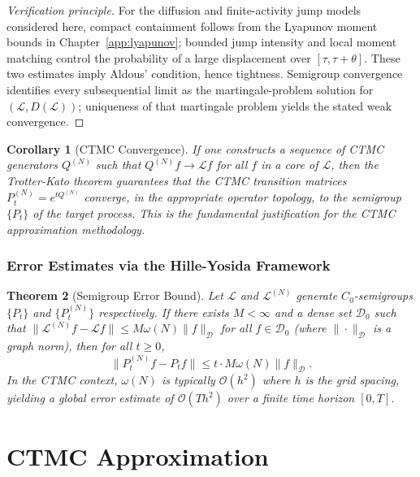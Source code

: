\documentclass[11pt,a4paper,openany]{book}
\theoremstyle{definition}
\theoremstyle{plain}
\newtheorem{theorem}{Theorem}[chapter]
\newtheorem{corollary}[theorem]{Corollary}
\theoremstyle{remark}
\newcommand{\1}{\mathbbm{1}}
\newcommand{\calL}{\mathcal{L}}
\newcommand{\calD}{\mathcal{D}}
\begin{document}
\begin{proof}[Verification principle]
For the diffusion and finite-activity jump models considered here, compact containment follows from the Lyapunov moment bounds in Chapter~\ref{app:lyapunov}; bounded jump intensity and local moment matching control the probability of a large displacement over $[\tau,\tau+\theta]$. These two estimates imply Aldous' condition, hence tightness. Semigroup convergence identifies every subsequential limit as the martingale-problem solution for $(\mathcal{L},D(\mathcal{L}))$; uniqueness of that martingale problem yields the stated weak convergence.
\end{proof}

\begin{corollary}[CTMC Convergence]
If one constructs a sequence of CTMC generators $Q^{(N)}$ such that $Q^{(N)} f \to \calL f$ for all $f$ in a core of $\calL$, then the Trotter-Kato theorem guarantees that the CTMC transition matrices $P_{t}^{(N)} = e^{t Q^{(N)}}$ converge, in the appropriate operator topology, to the semigroup $\{P_{t}\}$ of the target process. This is the fundamental justification for the CTMC approximation methodology.
\end{corollary}

\section{Error Estimates via the Hille-Yosida Framework}

\begin{theorem}[Semigroup Error Bound]
Let $\calL$ and $\calL^{(N)}$ generate $C_{0}$-semigroups $\{P_{t}\}$ and $\{P_{t}^{(N)}\}$ respectively. If there exists $M < \infty$ and a dense set $\calD_{0}$ such that $\|\calL^{(N)} f - \calL f\| \leq M \omega(N) \|f\|_{\calD}$ for all $f \in \calD_{0}$ (where $\|\cdot\|_{\calD}$ is a graph norm), then for all $t \geq 0$,
\[
\|P_{t}^{(N)} f - P_{t} f\| \leq t \cdot M \omega(N) \|f\|_{\calD}.
\]
In the CTMC context, $\omega(N)$ is typically $\mathcal{O}(h^{2})$ where $h$ is the grid spacing, yielding a global error estimate of $\mathcal{O}(T h^{2})$ over a finite time horizon $[0, T]$.
\end{theorem}

\part{CTMC Approximation}
\label{part:ctmc}
\end{document}
